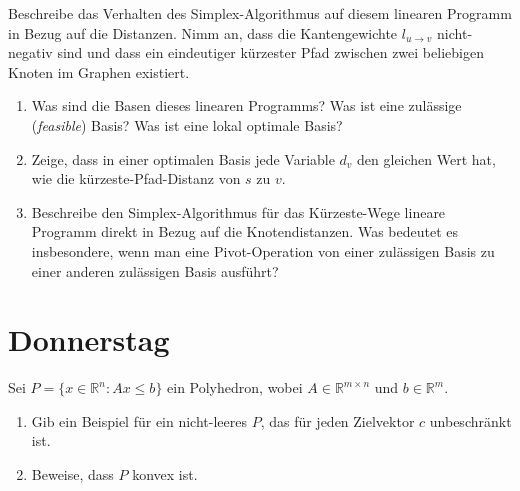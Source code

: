 \documentclass{uebung_cs}
\begin{document}
\begin{aufgabe}
	Beschreibe das Verhalten des Simplex-Algorithmus auf diesem linearen Programm in Bezug auf die Distanzen. Nimm an, dass die Kantengewichte $l_{u \rightarrow v}$ nicht-negativ sind und dass ein eindeutiger kürzester Pfad zwischen zwei beliebigen Knoten im Graphen existiert.
	\begin{enumerate}
		\item Was sind die Basen dieses linearen Programms? Was ist eine zulässige (\textit{feasible}) Basis? Was ist eine lokal optimale Basis?
		\item Zeige, dass in einer optimalen Basis jede Variable $d_v$ den gleichen Wert hat, wie die kürzeste-Pfad-Distanz von $s$ zu $v$.
		\item Beschreibe den Simplex-Algorithmus für das Kürzeste-Wege lineare Programm direkt in Bezug auf die Knotendistanzen. Was bedeutet es insbesondere, wenn man eine Pivot-Operation von einer zulässigen Basis zu einer anderen zulässigen Basis ausführt?
	\end{enumerate}
	
\end{aufgabe}

\section*{Donnerstag}

\begin{aufgabe}[Polyeder]
	Sei $P=\{ x\in \mathbb{R}^n : Ax\leq b \}$ ein Polyhedron, wobei $A\in \mathbb{R}^{m\times n}$ und $b\in \mathbb{R}^m$.
	\begin{enumerate}
		\item Gib ein Beispiel für ein nicht-leeres $P$, das für jeden Zielvektor $c$ unbeschränkt ist.
		\item Beweise, dass $P$ konvex ist.
	\end{enumerate}
\end{aufgabe}
\end{document}
